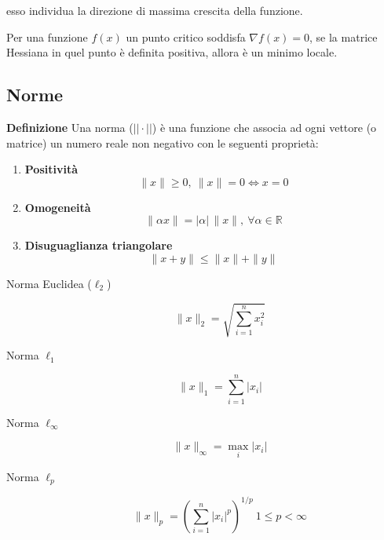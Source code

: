 \documentclass{article}
\newcommand{\df}{\noindent\textbf{Definizione} }
\begin{document}
esso individua la direzione di massima crescita della funzione.\newline

Per una funzione $f(x)$ un punto critico soddisfa $\nabla f(x)=0$, se la matrice Hessiana in quel punto è definita positiva, allora è un minimo locale.

\subsection{Norme}

\df Una norma ($||\cdot||$) è una funzione che associa ad ogni vettore (o matrice) un numero reale non negativo con le seguenti proprietà:

\begin{enumerate}
    \item \textbf{Positività}
    \[
    \|x\|\ge 0,
    \
    \|x\|=0
    \iff
    x=0
    \]

    \item \textbf{Omogeneità}
    \[
    \|\alpha x\|
    =
    |\alpha|\,\|x\|,
    \
    \forall \alpha\in\mathbb{R}
    \]

    \item \textbf{Disuguaglianza triangolare}
    \[
    \|x+y\|
    \le
    \|x\|+\|y\|
    \]\newline
\end{enumerate}

\begin{description}
    \item[Norma Euclidea (\texorpdfstring{\(\ell_2\)}{l2})] 

    \[
    \|x\|_2
    =
    \sqrt{\sum_{i=1}^{n}x_i^2}
    \]

    \item [Norma \texorpdfstring{\(\ell_1\)}{l1}]

    \[
    \|x\|_1
    =
    \sum_{i=1}^{n}|x_i|
    \]

    \item [Norma \texorpdfstring{\(\ell_\infty\)}{linf}]

    \[
    \|x\|_\infty
    =
    \max_i |x_i|
    \]

    \item [Norma \texorpdfstring{\(\ell_p\)}{lp}]

    \[
    \|x\|_p
    =
    \left(
    \sum_{i=1}^{n}|x_i|^p
    \right)^{1/p}
    \
    1\le p<\infty
    \]\newline
    
\end{description}
\end{document}
